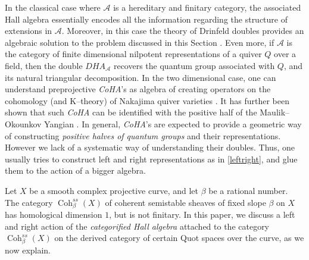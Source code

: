 \documentclass[11pt]{article}
\newcommand{\cohbetass}{\operatorname{Coh}^{ss}_{\beta}(X)}
\begin{document}
\noindent In the classical case where $\mathcal{A}$ is a hereditary and finitary category, the associated Hall algebra essentially encodes all the information regarding the structure of extensions in $\mathcal{A}$. Moreover, in this case the theory of Drinfeld doubles provides an algebraic solution to the problem discussed in this Section \cite{schiffmann2009lectureshallalgebras}. Even more, if $\mathcal{A}$ is the category of finite dimensional nilpotent representations of a quiver $Q$ over a field, then the double $D{HA}_\mathcal{A}$ recovers the quantum group associated with $Q$, and its natural triangular decomposition. In the two dimensional case, one can understand preprojective \textit{CoHA}'s as algebra of creating operators on the cohomology (and K--theory) of Nakajima quiver varieties \cite{MR3322196}. It has further been shown that such \textit{CoHA} can be identified with the positive half of the Maulik--Okounkov Yangian \cite{botta2025okounkovsconjecturebpslie, schiffmann2024cohomologicalhallalgebrasquivers}. In general, \textit{CoHA}'s are expected to provide a geometric way of constructing \textit{positive halves of quantum groups} and their representations. However we lack of a systematic way of understanding their doubles. Thus, one usually tries to construct left and right representations as in \eqref{leftright}, and glue them to the action of a bigger algebra. \newline




\noindent Let $X$ be a smooth complex projective curve, and let $\beta$ be a rational number. The category $\cohbetass$ of coherent semistable sheaves of fixed slope $\beta$ on $X$ has homological dimension $1$, but is not finitary. In this paper, we discuss a left and right action of the \textit{categorified Hall algebra} attached to the category $\cohbetass$ on the derived category of certain Quot spaces over the curve, as we now explain. 
\end{document}
